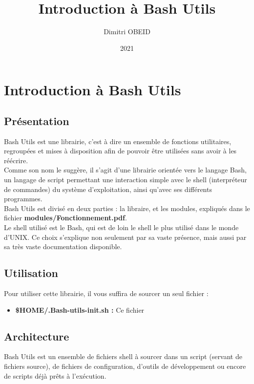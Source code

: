 \documentclass[a4paper,10pt]{article}
\title{\color{red}Introduction à Bash Utils}\color{white}
\author{Dimitri OBEID}
\date{2021}
\begin{document}
\maketitle
\newpage

\hypertarget{contents}{}
\tableofcontents
\newpage

\color{red}
\section{Introduction à Bash Utils}\color{white}

\color{green}
\subsection{Présentation}\color{white}
Bash Utils est une librairie, c'est à dire un ensemble de fonctions utilitaires, regroupées et mises à disposition afin de pouvoir être utilisées sans avoir à les réécrire.\\[1\baselineskip]

Comme son nom le suggère, il s'agit d'une librairie orientée vers le langage Bash, un langage de script permettant une interaction simple avec le shell (interpréteur de commandes) du système d'exploitation, ainsi qu'avec ses différents programmes.\\[1\baselineskip]

Bash Utils est divisé en deux parties : la libraire, et les modules, expliqués dans le fichier \linebreak \textbf{\color{lime}modules/Fonctionnement.pdf\color{white}}.\\[1\baselineskip]

Le shell utilisé est le Bash, qui est de loin le shell le plus utilisé dans le monde d'UNIX. Ce choix s'explique non seulement par sa vaste présence, mais aussi par sa très vaste documentation disponible.

\color{green}
\subsection{Utilisation}\color{white}
Pour utiliser cette librairie, il vous suffira de sourcer un seul fichier :
\begin{itemize}
    \item \color{orange}\textbf{\$HOME\color{lime}/.Bash-utils-init.sh\color{white} :} \color{white} Ce fichier 
\end{itemize}

\color{green}
\subsection{Architecture}\color{white}
Bash Utils est un ensemble de fichiers shell à sourcer dans un script (servant de fichiers source), de fichiers de configuration, d'outils de développement ou encore de scripts déjà prêts à l'exécution.\\[1\baselineskip]
\end{document}
